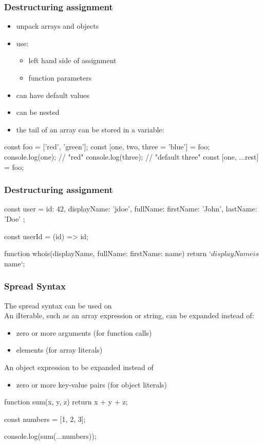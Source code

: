 \begin{frame}[fragile] \frametitle{Destructuring assignment}
\begin{itemize}
  \item unpack arrays and objects
  \item use:
  \begin{itemize}
    \item left hand side of assignment
    \item function parameters
  \end{itemize}
  \item can have default values
  \item can be nested
  \item the tail of an array can be stored in a variable: 
\end{itemize}
\begin{CodeBox}{}
const foo = ['red', 'green'];
const [one, two, three = 'blue'] = foo;
console.log(one); // "red"
console.log(three); // "default three"
const [one, ...rest] = foo;
\end{CodeBox}
\end{frame}

\begin{frame}[fragile] \frametitle{Destructuring assignment}
\begin{CodeBox}{}
const user = {
  id: 42,
  displayName: 'jdoe',
  fullName: {
    firstName: 'John',
    lastName: 'Doe'
  }
};

const userId = ({id}) => id;

function whois({displayName, fullName: {firstName: name}}) {
  return `${displayName} is ${name}`;
}
\end{CodeBox}
\end{frame}

\begin{frame}[fragile] \frametitle{Spread Syntax}
The spread syntax  can be used on \\
An iIterable, such as an array expression or string, can be expanded instead of:
\begin{itemize}
  \item zero or more arguments (for function calls)
  \item elements (for array literals)
\end{itemize}

An object expression to be expanded instead of
\begin{itemize}
  \item  zero or more key-value pairs (for object literals)
\end{itemize}

\begin{CodeBox}{}
function sum(x, y, z) {
  return x + y + z;
}

const numbers = [1, 2, 3];

console.log(sum(...numbers));
\end{CodeBox}
\end{frame}

